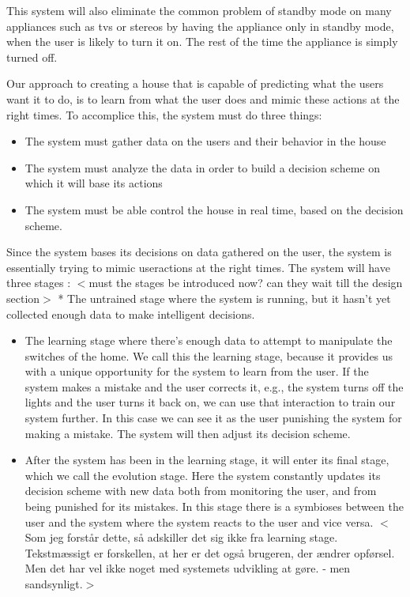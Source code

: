 This system will also eliminate the common problem of standby mode on many appliances such as tvs or stereos by having the appliance only in standby mode, when the user is likely to turn it on. The rest of the time the appliance is simply turned off.

Our approach to creating a house that is capable of predicting what the users want it to do, is to learn from what the user does and mimic these actions at the right times. To accomplice this, the system must do three things:

\begin{itemize}
\item The system must gather data on the users and their behavior in the house

\item The system must analyze the data in order to build a decision scheme on which it will base its actions

\item The system must be able control the house in real time, based on the decision scheme.

\end{itemize}

Since the system bases its decisions on data gathered on the user, the system is essentially trying to mimic useractions at the right times. The system will have three stages :
$<$must the stages be introduced now? can they wait till the design section$>$
* The untrained stage where the system is running, but it hasn't yet collected enough data to make intelligent decisions. 

\begin{itemize}
\item The learning stage where there's enough data to attempt to manipulate the switches of the home. We call this the learning stage, because it provides us with a unique opportunity for the system to learn from the user. If the system makes a mistake and the user corrects it, e.g., the system turns off the lights and the user turns it back on, we can use that interaction to train our system further. In this case we can see it as the user punishing the system for making a mistake. The system will then adjust its decision scheme. 

\item After the system has been in the learning stage, it will enter its final stage, which we call the evolution stage. Here the system constantly updates its decision scheme with new data both from monitoring the user, and from being punished for its mistakes. In this stage there is a symbioses between the user and the system where the system reacts to the user and vice versa. $<$Som jeg forstår dette, så adskiller det sig ikke fra learning stage. Tekstmæssigt er forskellen, at her er det også brugeren, der ændrer opførsel. Men det har vel ikke noget med systemets udvikling at gøre. - men sandsynligt.$>$

\end{itemize}

